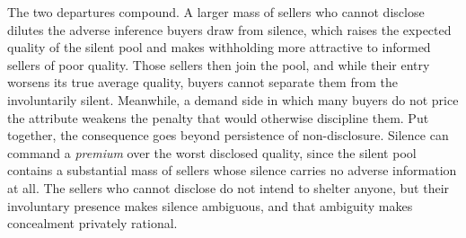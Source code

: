 The two departures compound. A larger mass of sellers who cannot
disclose dilutes the adverse inference buyers draw from silence, which raises the expected quality
of the silent pool and makes withholding more attractive to informed sellers of poor quality.
Those sellers then join the pool, and while their entry worsens its true average quality, buyers
cannot separate them from the involuntarily silent. Meanwhile, a demand side in which many buyers
do not price the attribute weakens the penalty that would otherwise discipline them. Put together,
the consequence goes beyond persistence of non-disclosure. Silence can command a
\emph{premium} over the worst disclosed quality, since the silent pool contains a substantial
mass of sellers whose silence carries no adverse information at all. The sellers who cannot
disclose do not intend to shelter anyone, but their involuntary presence makes silence ambiguous,
and that ambiguity makes concealment privately rational.
